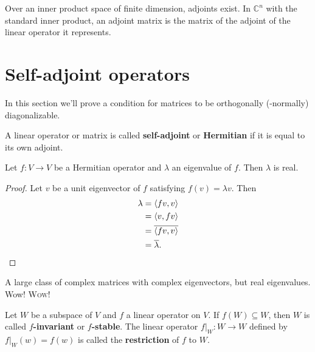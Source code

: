 \begin{theorem}
  Over an inner product space of finite dimension, adjoints exist.
  In \(\mathbb{C}^n\) with the standard inner product,
  an adjoint matrix is the matrix of the adjoint of the linear operator it represents.
\end{theorem}

\section{Self-adjoint operators}
In this section we'll prove a condition for matrices to be orthogonally (-normally) diagonalizable.
\begin{definition}
  A linear operator or matrix is called \textbf{self-adjoint} or \textbf{Hermitian}
  if it is equal to its own adjoint.
\end{definition}

\begin{lemma}
  Let \(f: V\to V\) be a Hermitian operator and \(\lambda\) an eigenvalue of \(f\).
  Then \(\lambda\) is real.
\end{lemma}
\begin{proof}
  Let \(v\) be a unit eigenvector of \(f\) satisfying \(f(v) = \lambda v\).
  Then
  \begin{align}
    \lambda &= \left\langle fv, v\right\rangle \\
    &= \left\langle v, fv\right\rangle \\
    &= \overline{\left\langle fv, v\right\rangle} \\
    &= \overline{\lambda}.
  \end{align}
\end{proof}
A large class of complex matrices with complex eigenvectors, but real eigenvalues.
Wow! \textsc{Wow!}

\begin{definition}[Restriction]
  Let \(W\) be a subspace of \(V\) and \(f\) a linear operator on \(V\).
  If \(f(W) \subseteq W\), then \(W\) is called
  \textbf{\(f\)-invariant} or \textbf{\(f\)-stable}.
  The linear operator \(\left.f\right|_W: W \to W\) defined by \(\left.f\right|_W(w) = f(w)\)
  is called the \textbf{restriction} of \(f\) to \(W\).
\end{definition}

